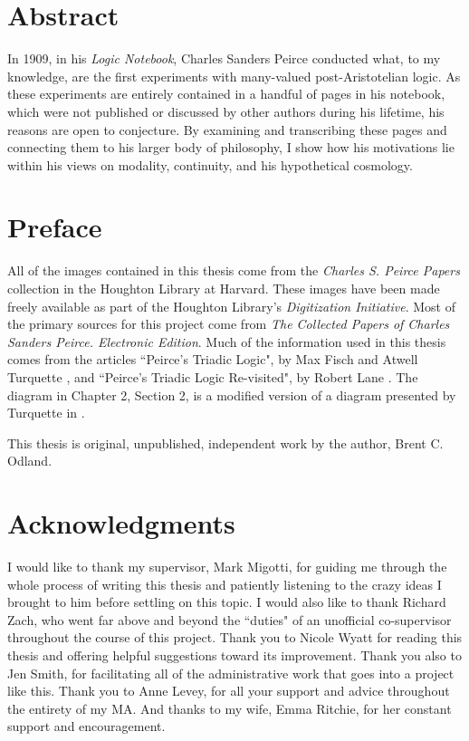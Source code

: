 
\chapter{Abstract}

In 1909, in his \textit{Logic Notebook}, Charles Sanders Peirce conducted what, to my knowledge, are the first experiments with many-valued post-Aristotelian logic. As these experiments are entirely contained in a handful of pages in his notebook, which were not published or discussed by other authors during his lifetime, his reasons are open to conjecture. By examining and transcribing these pages and connecting them to his larger body of philosophy, I show how his motivations lie within his views on modality, continuity, and his hypothetical cosmology.


\chapter{Preface}

All of the images contained in this thesis come from the \textit{Charles S. Peirce Papers} collection in the Houghton Library at Harvard. These images have been made freely available as part of the Houghton Library's \textit{Digitization Initiative}. Most of the primary sources for this project come from \textit{The Collected Papers of Charles Sanders Peirce. Electronic Edition}. Much of the information used in this thesis comes from the articles ``Peirce's Triadic Logic", by Max Fisch and Atwell Turquette \citeyearpar{fisch_peirces_1966}, and ``Peirce's Triadic Logic Re-visited", by Robert Lane \citeyearpar{lane_peirces_1999}. The diagram in Chapter 2, Section 2, is a modified version of a diagram presented by Turquette in \citeyear{turquette_dualism_1972}.

This thesis is original, unpublished, independent work by the author,
Brent C. Odland.
  
\chapter{Acknowledgments}


I would like to thank my supervisor, Mark Migotti, for guiding me through the whole process of writing this thesis and patiently listening to the crazy ideas I brought to him before settling on this topic. I would also like to thank Richard Zach, who went far above and beyond the ``duties" of an unofficial co-supervisor throughout the course of this project. Thank you to Nicole Wyatt for reading this thesis and offering helpful suggestions toward its improvement. Thank you also to Jen Smith, for facilitating all of the administrative work that goes into a project like this. Thank you to Anne Levey, for all your support and advice throughout the entirety of my MA. And thanks to my wife, Emma Ritchie, for her constant support and encouragement.

